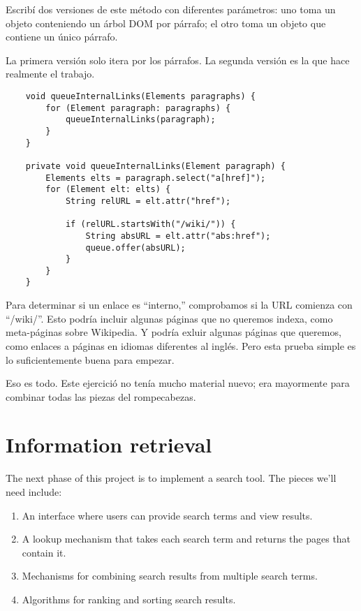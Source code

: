 \documentclass[12pt]{book}
\theoremstyle{exercise}
\begin{document}

Escribí dos versiones de este método con diferentes parámetros: uno
toma un objeto  conteniendo un árbol DOM por párrafo;
el otro toma un objeto  que contiene un único párrafo.


La primera versión solo itera por los párrafos. La segunda versión es
la que hace realmente el trabajo.

\begin{verbatim}
    void queueInternalLinks(Elements paragraphs) {
        for (Element paragraph: paragraphs) {
            queueInternalLinks(paragraph);
        }
    }

    private void queueInternalLinks(Element paragraph) {
        Elements elts = paragraph.select("a[href]");
        for (Element elt: elts) {
            String relURL = elt.attr("href");

            if (relURL.startsWith("/wiki/")) {
                String absURL = elt.attr("abs:href");
                queue.offer(absURL);
            }
        }
    }
\end{verbatim}


Para determinar si un enlace es ``interno,'' comprobamos si la URL
comienza con ``/wiki/''. Esto podría incluir algunas páginas que no queremos
indexa, como meta-páginas sobre Wikipedia. Y podría exluir algunas páginas
que queremos, como enlaces a páginas en idiomas diferentes al inglés. Pero esta
prueba simple es lo suficientemente buena para empezar.


Eso es todo. Este ejercició no tenía mucho material nuevo; era mayormente
para combinar todas las piezas del rompecabezas.


\section{Information retrieval}
\label{information-retrieval}


The next phase of this project is to implement a search tool. The pieces
we'll need include:

\begin{enumerate}

\item
  An interface where users can provide search terms and view results.

\item
  A lookup mechanism that takes each search term and returns the pages
  that contain it.

\item
  Mechanisms for combining search results from multiple search terms.

\item
  Algorithms for ranking and sorting search results.

\end{enumerate}
\end{document}
